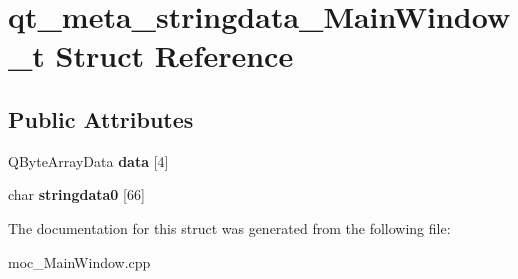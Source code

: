 \hypertarget{structqt__meta__stringdata__MainWindow__t}{}\section{qt\+\_\+meta\+\_\+stringdata\+\_\+\+Main\+Window\+\_\+t Struct Reference}
\label{structqt__meta__stringdata__MainWindow__t}
\subsection*{Public Attributes}
\begin{DoxyCompactItemize}
\item 
\mbox{\label{structqt__meta__stringdata__MainWindow__t_a332d7fa058028f7613b5ba68abb5a7fe}} 
Q\+Byte\+Array\+Data {\bfseries data} \mbox{[}4\mbox{]}
\item 
\mbox{\label{structqt__meta__stringdata__MainWindow__t_a00ee588b8748759117df943435aa7113}} 
char {\bfseries stringdata0} \mbox{[}66\mbox{]}
\end{DoxyCompactItemize}


The documentation for this struct was generated from the following file\+:\begin{DoxyCompactItemize}
\item 
moc\+\_\+\+Main\+Window.\+cpp\end{DoxyCompactItemize}
